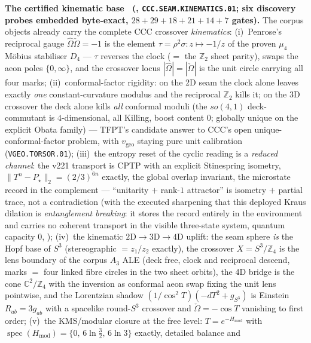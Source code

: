 \documentclass[11pt,a4paper]{article}
\newcommand{\Z}{\mathbb Z}
\begin{document}
\par\smallskip\noindent\textbf{The certified kinematic base \mE\ (,
\texttt{CCC.SEAM.KINEMATICS.01}; six discovery probes embedded byte-exact, $28{+}29{+}18{+}21{+}14{+}7$
gates).}  The corpus objects already carry the complete CCC crossover \emph{kinematics}:
(i)~Penrose's reciprocal gauge $\hat\Omega\check\Omega=-1$ is the element $\tau=\rho^2\sigma:
z\mapsto-1/z$ of the proven $\mu_4$ M\"obius stabiliser $D_4$ --- $\tau$ reverses the clock
($=$ the $\Z_2$ sheet parity), swaps the aeon poles $\{0,\infty\}$, and the crossover locus
$|\hat\Omega|=|\check\Omega|$ is the unit circle carrying all four marks; (ii)~conformal-factor
rigidity: on the 2D seam the clock alone leaves exactly \emph{one} constant-curvature modulus and
the reciprocal $\Z_2$ kills it; on the 3D crossover the deck alone kills \emph{all} conformal
moduli (the $so(4,1)$ deck-commutant is $4$-dimensional, all Killing, boost content $0$; globally
unique on the explicit Obata family) --- TFPT's candidate answer to CCC's open unique-conformal-factor
problem, with $v_{\mathrm{geo}}$ staying pure unit calibration (\texttt{VGEO.TORSOR.01});
(iii)~the entropy reset of the cyclic reading is a \emph{reduced channel}: the v221 transport is
CPTP with an explicit Stinespring isometry, $\|T^n-P_\star\|_2=(2/3)^{6n}$ exactly, the global
overlap invariant, the microstate record in the complement --- ``unitarity $+$ rank-$1$ attractor''
is isometry $+$ partial trace, not a contradiction (with the executed sharpening that this deployed
Kraus dilation is \emph{entanglement breaking}: it stores the record entirely in the environment and
carries no coherent transport in the visible three-state system, quantum capacity $0$,
); (iv)~the kinematic $2\mathrm D\to3\mathrm D\to
4\mathrm D$ uplift: the seam sphere \emph{is} the Hopf base of $S^3$ (stereographic $=z_1/z_2$
exactly), the crossover $X=S^3/\Z_4$ is the lens boundary of the corpus $A_3$ ALE (deck free,
clock and reciprocal descend, marks $=$ four linked fibre circles in the two sheet orbits), the
4D bridge is the cone $\mathbb C^2/\Z_4$ with the inversion as conformal aeon swap fixing the unit
lens pointwise, and the Lorentzian shadow $(1/\cos^2T)(-dT^2+g_{S^3})$ is Einstein $R_{ab}=3g_{ab}$
with a spacelike round-$S^3$ crossover and $\check\Omega=-\cos T$ vanishing to first order;
(v)~the KMS/modular closure at the free level: $T=e^{-H_{\mathrm{mod}}}$ with
$\operatorname{spec}(H_{\mathrm{mod}})=\{0,\,6\ln\tfrac32,\,6\ln3\}$ exactly, detailed balance and
\end{document}
